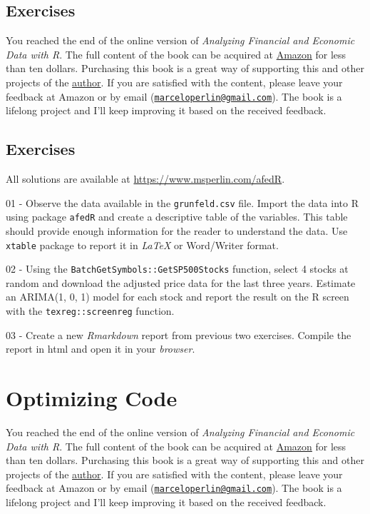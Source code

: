 \documentclass[
  12pt,
]{book}
\newenvironment{pleasebuyit}
{\begin{noteblock}
		
	} {\end{noteblock}}
\begin{document}
\hypertarget{exercises-13}{%
\section{Exercises}\label{exercises-13}}

\begin{pleasebuyit}
You reached the end of the online version of \emph{Analyzing Financial
and Economic Data with R}. The full content of the book can be acquired
at \href{https://www.amazon.com/dp/B084LSNXMN}{Amazon} for less than ten
dollars. Purchasing this book is a great way of supporting this and
other projects of the \href{https://www.msperlin.com/blog/}{author}. If
you are satisfied with the content, please leave your feedback at Amazon
or by email
(\href{mailto:marceloperlin@gmail.com}{\nolinkurl{marceloperlin@gmail.com}}).
The book is a lifelong project and I'll keep improving it based on the
received feedback.
\end{pleasebuyit}

\hypertarget{exercises-14}{%
\section{Exercises}\label{exercises-14}}

All solutions are available at \url{https://www.msperlin.com/afedR}.

01 -
Observe the data available in the \texttt{grunfeld.csv} file. Import the data into R using package \texttt{afedR} and create a descriptive table of the variables. This table should provide enough information for the reader to understand the data. Use \texttt{xtable} package to report it in \emph{LaTeX} or Word/Writer format.

02 -
Using the \texttt{BatchGetSymbols::GetSP500Stocks} function, select 4 stocks at random and download the adjusted price data for the last three years. Estimate an ARIMA(1, 0, 1) model for each stock and report the result on the R screen with the \texttt{texreg::screenreg} function.

03 -
Create a new \emph{Rmarkdown} report from previous two exercises. Compile the report in html and open it in your \emph{browser}.

\hypertarget{optimizing}{%
\chapter{Optimizing Code}\label{optimizing}}

\begin{pleasebuyit}
You reached the end of the online version of \emph{Analyzing Financial
and Economic Data with R}. The full content of the book can be acquired
at \href{https://www.amazon.com/dp/B084LSNXMN}{Amazon} for less than ten
dollars. Purchasing this book is a great way of supporting this and
other projects of the \href{https://www.msperlin.com/blog/}{author}. If
you are satisfied with the content, please leave your feedback at Amazon
or by email
(\href{mailto:marceloperlin@gmail.com}{\nolinkurl{marceloperlin@gmail.com}}).
The book is a lifelong project and I'll keep improving it based on the
received feedback.
\end{pleasebuyit}
\end{document}
